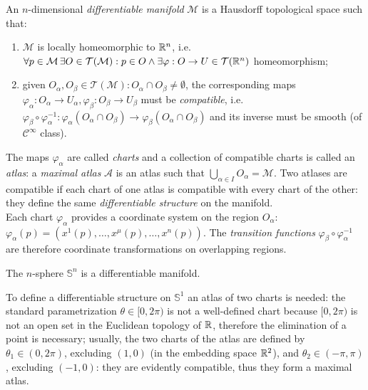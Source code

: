 \begin{definition}
  An $ n $-dimensional \textit{differentiable manifold} $ \mathcal{M} $ is a Hausdorff topological space such that:
  \begin{enumerate}
    \item $ \mathcal{M} $ is locally homeomorphic to $ \mathbb{R}^n $, i.e. $ \forall p\in\mathcal{M} \, \exists O \in \mathcal{T}(\mathcal{M}) : p \in O \land \exists \varphi : O \rightarrow U \in \mathcal{T}(\mathbb{R}^n) $ homeomorphism;
    \item given $ O_{\alpha},O_{\beta} \in \mathcal{T}(\mathcal{M}) : O_{\alpha} \cap O_{\beta} \neq \emptyset $, the corresponding maps $ \varphi_{\alpha} : O_{\alpha} \rightarrow U_{\alpha}, \varphi_{\beta} : O_{\beta} \rightarrow U_{\beta} $ must be \textit{compatible}, i.e. $ \varphi_{\beta} \circ \varphi_{\alpha}^{-1} : \varphi_{\alpha}(O_{\alpha} \cap O_{\beta}) \rightarrow \varphi_{\beta}(O_{\alpha} \cap O_{\beta}) $ and its inverse must be smooth (of $ \mathcal{C}^{\infty} $ class).
  \end{enumerate}
\end{definition}

The maps $ \varphi_{\alpha} $ are called \textit{charts} and a collection of compatible charts is called an \textit{atlas}: a \textit{maximal atlas} $ \mathcal{A} $ is an atlas such that $ \bigcup_{\alpha \in I} O_{\alpha} = \mathcal{M} $. Two atlases are compatible if each chart of one atlas is compatible with every chart of the other: they define the same \textit{differentiable structure} on the manifold.\\
Each chart $ \varphi_{\alpha} $ provides a coordinate system on the region $ O_{\alpha} $: $ \varphi_{\alpha}(p) = \left( x^1(p), \dots, x^{\mu}(p), \dots, x^n(p) \right) $. The \textit{transition functions} $ \varphi_{\beta} \circ \varphi_{\alpha}^{-1} $ are therefore coordinate transformations on overlapping regions.

\begin{example}
  The $ n $-sphere $ \mathbb{S}^n $ is a differentiable manifold.
\end{example}
\begin{example}
  To define a differentiable structure on $ \mathbb{S}^1 $ an atlas of two charts is needed: the standard parametrization $ \theta \in [0, 2\pi) $ is not a well-defined chart because $ [0,2\pi) $ is not an open set in the Euclidean topology of $ \mathbb{R} $, therefore the elimination of a point is necessary; usually, the two charts of the atlas are defined by $ \theta_1 \in (0,2\pi) $, excluding $ (1,0) $ (in the embedding space $ \mathbb{R}^2 $), and $ \theta_2 \in (-\pi,\pi) $, excluding $ (-1,0) $: they are evidently compatible, thus they form a maximal atlas.
\end{example}

